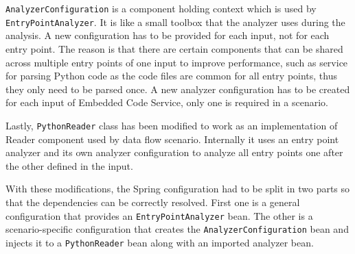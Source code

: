 \par
\texttt{AnalyzerConfiguration} is a component holding context which is used by \texttt{EntryPointAnalyzer}. It is like a small toolbox that the analyzer uses during the analysis. A new configuration has to be provided for each input, not for each entry point. The reason is that there are certain components that can be shared across multiple entry points of one input to improve performance, such as service for parsing Python code as the code files are common for all entry points, thus they only need to be parsed once. A new analyzer configuration has to be created for each input of Embedded Code Service, only one is required in a scenario.
\par
Lastly, \texttt{PythonReader} class has been modified to work as an implementation of Reader component used by data flow scenario. Internally it uses an entry point analyzer and its own analyzer configuration to analyze all entry points one after the other defined in the input. 
\par
With these modifications, the Spring configuration had to be split in two parts so that the dependencies can be correctly resolved. First one is a general configuration that provides an \texttt{EntryPointAnalyzer} bean. The other is a scenario-specific configuration that creates the \texttt{AnalyzerConfiguration} bean and injects it to a \texttt{PythonReader} bean along with an imported analyzer bean.

